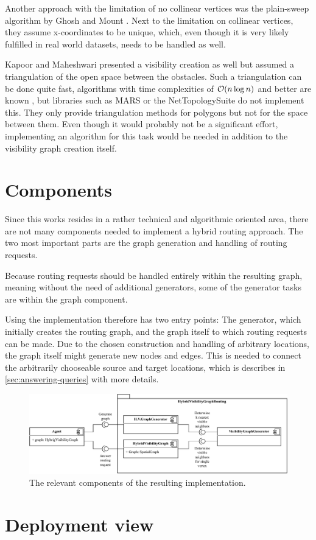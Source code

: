 			Another approach with the limitation of no collinear vertices was the plain-sweep algorithm by Ghosh and Mount \cite{ghosh-output-sensitive-vgraph}.
			Next to the limitation on collinear vertices, they assume x-coordinates to be unique, which, even though it is very likely fulfilled in real world datasets, needs to be handled as well.
			
			Kapoor and Maheshwari presented a visibility creation as well \cite{kapoor-shortest-path-vgraph} but assumed a triangulation of the open space between the obstacles.
			Such a triangulation can be done quite fast, algorithms with time complexities of $\mathcal{O}(n \log{n})$ and better are known \cite[58-60]{de-berg-computational-geometry}, but libraries such as MARS or the NetTopologySuite do not implement this.
			They only provide triangulation methods for polygons but not for the space between them.
			Even though it would probably not be a significant effort, implementing an algorithm for this task would be needed in addition to the visibility graph creation itself.
	
\section{Components}
\label{sec:components}

	Since this works resides in a rather technical and algorithmic oriented area, there are not many components needed to implement a hybrid routing approach.
	The two most important parts are the graph generation and handling of routing requests.
	
	Because routing requests should be handled entirely within the resulting graph, meaning without the need of additional generators, some of the generator tasks are within the graph component.
	
	Using the implementation therefore has two entry points:
	The generator, which initially creates the routing graph, and the graph itself to which routing requests can be made.
	Due to the chosen construction and handling of arbitrary locations, the graph itself might generate new nodes and edges.
	This is needed to connect the arbitrarily chooseable source and target locations, which is describes in \cref{sec:answering-queries} with more details.
	
	\begin{figure}[h]
		\begin{figcenter}
			\includegraphics[width=\textwidth]{images/components.pdf}
		\end{figcenter}
		\caption{The relevant components of the resulting implementation.}
	\end{figure}

\section{Deployment view}


